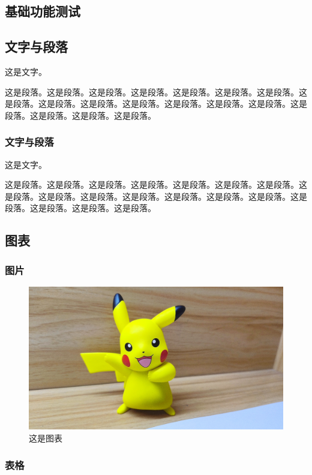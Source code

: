 \begin{ujnbody}
    \section{基础功能测试}
    \subsection{文字与段落}
    这是文字。

    这是段落。这是段落。这是段落。这是段落。这是段落。这是段落。这是段落。这是段落。这是段落。这是段落。这是段落。这是段落。这是段落。这是段落。这是段落。这是段落。这是段落。这是段落。
    \subsubsection{文字与段落}
    这是文字。

    这是段落。这是段落。这是段落。这是段落。这是段落。这是段落。这是段落。这是段落。这是段落。这是段落。这是段落。这是段落。这是段落。这是段落。这是段落。这是段落。这是段落。这是段落。
    \subsection{图表}

    \subsubsection{图片}

    \begin{figure}[htbp]
        \centering
        \includegraphics[scale=0.1, ]{figures/pikachu.jpg}
        \caption{这是图表}
    \end{figure}

    \subsubsection{表格}


\end{ujnbody}
